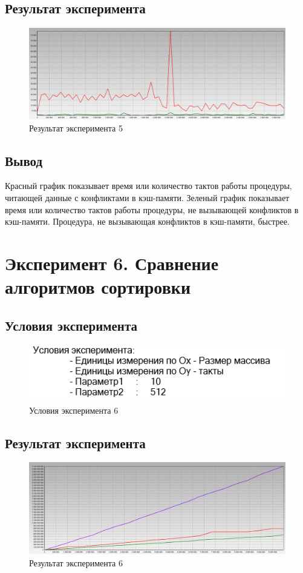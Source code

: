 \documentclass{article}
\begin{document}
\subsection{Результат эксперимента}
\begin{figure}[h]
	\centering
	\includegraphics[scale=0.5]{tools/exp_5.png}
	\caption{Результат эксперимента 5}
\end{figure}

\subsection{Вывод}
Красный график показывает время или количество тактов работы процедуры, читающей данные с конфликтами в кэш-памяти. 
Зеленый график показывает время или количество тактов работы процедуры, не вызывающей конфликтов в кэш-памяти.
Процедура, не вызывающая конфликтов в кэш-памяти, быстрее.

\clearpage\section{Эксперимент 6. Сравнение алгоритмов сортировки}
\subsection{Условия эксперимента}
\begin{figure}[h]
	\centering
	\includegraphics[scale=0.7]{tools/in_6.png}
	\caption{Условия эксперимента 6}
\end{figure}

\subsection{Результат эксперимента}
\begin{figure}[h]
	\centering
	\includegraphics[scale=0.5]{tools/exp_6.png}
	\caption{Результат эксперимента 6}
\end{figure}
\end{document}
